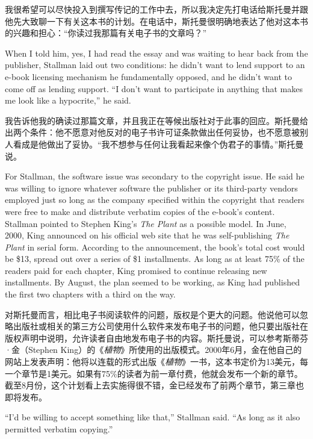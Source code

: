 \ifdefined\chs
我很希望可以尽快投入到撰写传记的工作中去，所以我决定先打电话给斯托曼并跟他先大致聊一下有关这本书的计划。在电话中，斯托曼很明确地表达了他对这本书的兴趣和担心：``你读过我那篇有关电子书的文章吗？''
\fi

\ifdefined\eng
When I told him, yes, I had read the essay and was waiting to hear back from the publisher, Stallman laid out two conditions: he didn't want to lend support to an e-book licensing mechanism he fundamentally opposed, and he didn't want to come off as lending support. ``I don't want to participate in anything that makes me look like a hypocrite,'' he said.
\fi

\ifdefined\chs
我告诉他我的确读过那篇文章，并且我正在等候出版社对于此事的回应。斯托曼给出两个条件：他不愿意对他反对的电子书许可证条款做出任何妥协，也不愿意被别人看成是他做出了妥协。``我不想参与任何让我看起来像个伪君子的事情。''斯托曼说。
\fi

\ifdefined\eng
For Stallman, the software issue was secondary to the copyright issue. He said he was willing to ignore whatever software the publisher or its third-party vendors employed just so long as the company specified within the copyright that readers were free to make and distribute verbatim copies of the e-book's content. Stallman pointed to Stephen King's \textit{The Plant} as a possible model. In June, 2000, King announced on his official web site that he was self-publishing \textit{The Plant} in serial form. According to the announcement, the book's total cost would be \$13, spread out over a series of \$1 installments. As long as at least 75\% of the readers paid for each chapter, King promised to continue releasing new installments. By August, the plan seemed to be working, as King had published the first two chapters with a third on the way.
\fi

\ifdefined\chs
对斯托曼而言，相比电子书阅读软件的问题，版权是个更大的问题。他说他可以忽略出版社或相关的第三方公司使用什么软件来发布电子书的问题，他只要出版社在版权声明中说明，允许读者自由地发布电子书的内容。斯托曼说，可以参考斯蒂芬·金（Stephen King）的《\textit{植物}》所使用的出版模式。2000年6月，金在他自己的网站上发表声明：他将以连载的形式出版《\textit{植物}》一书，这本书定价为13美元，每一个章节是1美元。如果有75\%的读者为前一章付费，他就会发布一个新的章节。截至8月份，这个计划看上去实施得很不错，金已经发布了前两个章节，第三章也即将发布。
\fi

\ifdefined\eng
``I'd be willing to accept something like that,'' Stallman said. ``As long as it also permitted verbatim copying.''
\ifdefined{}
\fi
\fi

